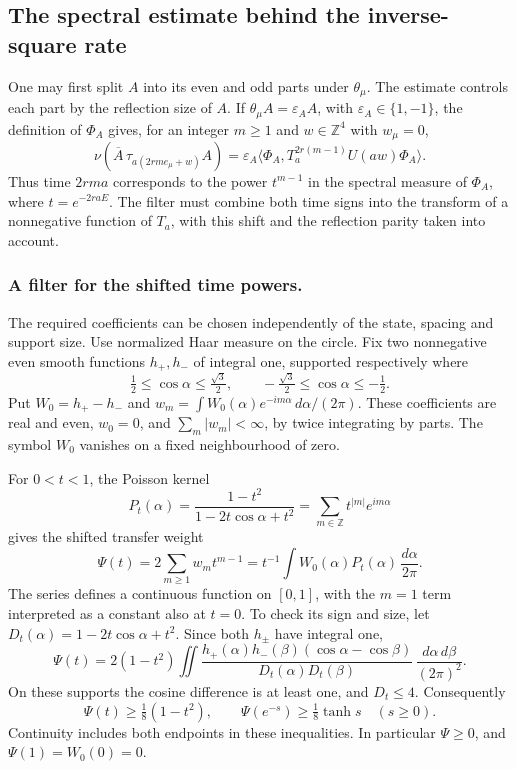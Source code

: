 \documentclass[11pt,letterpaper,reqno]{amsart}
\theoremstyle{definition}
\theoremstyle{remark}
\begin{document}
\subsection{The spectral estimate behind the inverse-square rate}

One may first split $A$ into its even and odd parts under
$\theta_\mu$. The estimate controls each part by the
reflection size of $A$. If $\theta_\mu A=\varepsilon_A A$, with
$\varepsilon_A\in\{1,-1\}$, the definition of $\Phi_A$ gives, for
an integer $m\ge1$ and $w\in\mathbb Z^4$ with $w_\mu=0$,
\[
 \nu(\overline A\,\tau_{a(2rme_\mu+w)}A)
 =\varepsilon_A\langle\Phi_A,
       T_a^{2r(m-1)}U(aw)\Phi_A\rangle.
\]
Thus time $2rma$ corresponds to the power $t^{m-1}$ in the
spectral measure of $\Phi_A$, where $t=e^{-2raE}$.
The filter must combine both time signs into the transform of a
nonnegative function of $T_a$, with this shift and the reflection
parity taken into account.
\subsubsection*{A filter for the shifted time powers.}
\label{hyp:spectral-filter}

The required coefficients can be chosen independently of the state,
spacing and support size. Use normalized Haar measure on the circle.
Fix two nonnegative even smooth functions $h_+,h_-$ of integral one,
supported respectively where
\[
 \tfrac12\le\cos\alpha\le\tfrac{\sqrt3}{2},
 \qquad
 -\tfrac{\sqrt3}{2}\le\cos\alpha\le-\tfrac12.
\]
Put $W_0=h_+-h_-$ and
$w_m=\int W_0(\alpha)e^{-im\alpha}\,d\alpha/(2\pi)$.
These coefficients are real and even, $w_0=0$, and
$\sum_m|w_m|<\infty$, by twice integrating by parts.
The symbol $W_0$ vanishes on a fixed neighbourhood of zero.

For $0<t<1$, the Poisson kernel
\[
 P_t(\alpha)=\frac{1-t^2}{1-2t\cos\alpha+t^2}
           =\sum_{m\in\mathbb Z}t^{|m|}e^{im\alpha}
\]
gives the shifted transfer weight
\[
 \Psi(t)=2\sum_{m\ge1}w_m t^{m-1}
        =t^{-1}\int W_0(\alpha)P_t(\alpha)
                                      \,\frac{d\alpha}{2\pi}.
\]
The series defines a continuous function on $[0,1]$, with the
$m=1$ term interpreted as a constant also at $t=0$.
To check its sign and size, let $D_t(\alpha)=1-2t\cos\alpha+t^2$.
Since both $h_\pm$ have integral one,
\[
 \Psi(t)=2(1-t^2)\iint
 \frac{h_+(\alpha)h_-(\beta)
                       (\cos\alpha-\cos\beta)}
      {D_t(\alpha)D_t(\beta)}
                    \,\frac{d\alpha\,d\beta}{(2\pi)^2}.
\]
On these supports the cosine difference is at least one, and
$D_t\le4$. Consequently
\[
 \Psi(t)\ge\tfrac18(1-t^2),\qquad
 \Psi(e^{-s})\ge\tfrac18\tanh s\quad(s\ge0).
\]
Continuity includes both endpoints in these inequalities. In
particular $\Psi\ge0$, and $\Psi(1)=W_0(0)=0$.
\end{document}
